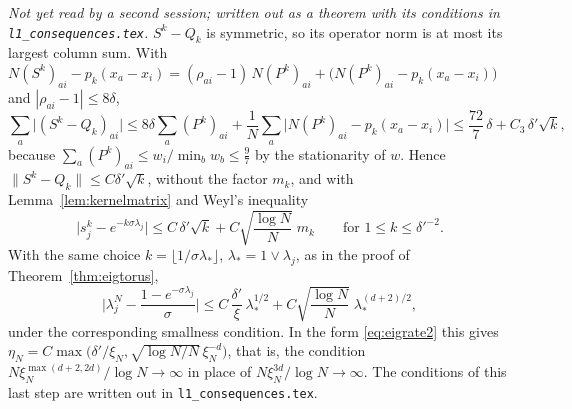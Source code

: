 \begin{remark}\label{rem:l1-eig}
\emph{Not yet read by a second session; written out as a theorem with its conditions in \texttt{l1\_consequences.tex}.} $S^k-Q_k$ is symmetric, so its operator norm is at most its
largest column sum. With $N(S^k)_{ai}-p_k(x_a-x_i)=(\rho_{ai}-1)\,N(P^k)_{ai}+\big(N(P^k)_{ai}-p_k(x_a-x_i)\big)$
and $|\rho_{ai}-1|\le8\delta$,
\[
 \sum_a\big|(S^k-Q_k)_{ai}\big|\le8\delta\sum_a(P^k)_{ai}+\frac1N\sum_a\big|N(P^k)_{ai}-p_k(x_a-x_i)\big|
 \le\frac{72}7\,\delta+C_3\,\delta'\sqrt k ,
\]
because $\sum_a(P^k)_{ai}\le w_i/\min_bw_b\le\frac97$ by the stationarity of $w$. Hence
$\|S^k-Q_k\|\le C\delta'\sqrt k$, without the factor $m_k$, and with Lemma~\ref{lem:kernelmatrix} and Weyl's
inequality
\[
 \big|s_j^k-e^{-k\sigma\lambda_j}\big|\le C\,\delta'\sqrt k+C\sqrt{\frac{\log N}{N}}\;m_k\qquad\text{for }1\le k\le\delta'^{-2}.
\]
With the same choice $k=\lfloor1/\sigma\lambda_*\rfloor$, $\lambda_*=1\vee\lambda_j$, as in the proof of
Theorem~\ref{thm:eigtorus},
\[
 \Big|\lambda^N_j-\frac{1-e^{-\sigma\lambda_j}}{\sigma}\Big|\le C\,\frac{\delta'}\xi\,\lambda_*^{1/2}
 +C\sqrt{\frac{\log N}{N}}\;\lambda_*^{(d+2)/2},
\]
under the corresponding smallness condition. In the form \eqref{eq:eigrate2} this gives
$\eta_N=C\max\big(\delta'/\xi_N,\sqrt{\log N/N}\,\xi_N^{-d}\big)$, that is, the condition
$N\xi_N^{\max(d+2,2d)}/\log N\to\infty$ in place of $N\xi_N^{3d}/\log N\to\infty$. The conditions of this
last step are written out in \texttt{l1\_consequences.tex}.
\end{remark}

